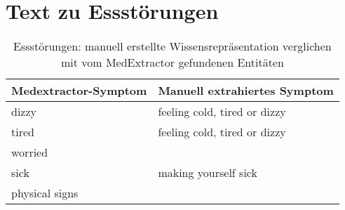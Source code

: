 \section{Text zu Essstörungen}
\label{sec:eatingdisorders} 

\begin{table}[H]
\begin{center}
\begin{tabular}{ll}
\toprule
  Medextractor-Symptom &                       Manuell extrahiertes Symptom \\
\midrule
              dizzy & feeling cold, tired or dizzy \\
               tired & feeling cold, tired or dizzy \\
             worried &                              \\
                sick &         making yourself sick \\
      physical signs &                              \\
\bottomrule
\end{tabular}
\caption{Essstörungen: manuell erstellte Wissensrepräsentation verglichen mit vom MedExtractor gefundenen Entitäten}
\label{tab:eatingdisorders_vergleich_manuell_medextractor}
\end{center}
\end{table}


